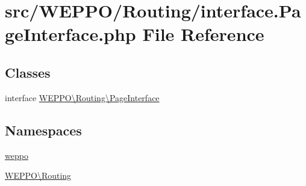 \hypertarget{interface_8PageInterface_8php}{}\section{src/\+W\+E\+P\+P\+O/\+Routing/interface.Page\+Interface.\+php File Reference}
\label{interface_8PageInterface_8php}
\subsection*{Classes}
\begin{DoxyCompactItemize}
\item 
interface \hyperlink{interfaceWEPPO_1_1Routing_1_1PageInterface}{W\+E\+P\+P\+O\textbackslash{}\+Routing\textbackslash{}\+Page\+Interface}
\end{DoxyCompactItemize}
\subsection*{Namespaces}
\begin{DoxyCompactItemize}
\item 
 \hyperlink{namespaceweppo}{weppo}
\item 
 \hyperlink{namespaceWEPPO_1_1Routing}{W\+E\+P\+P\+O\textbackslash{}\+Routing}
\end{DoxyCompactItemize}
